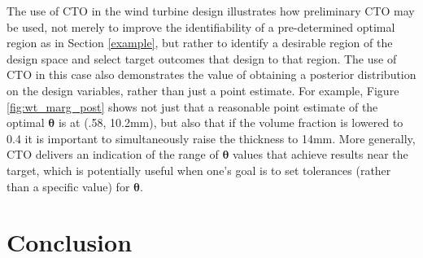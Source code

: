 \documentclass[12pt]{article}
\begin{document}
The use of CTO in the wind turbine design illustrates how preliminary CTO may be used, not merely to improve the identifiability of a pre-determined optimal region as in Section \ref{example}, but rather to identify a desirable region of the design space and select target outcomes that design to that region.
%
%
%
%
%
The use of CTO in this case also demonstrates the value of obtaining a posterior distribution on the design variables, rather than just a point estimate.
%
For example, Figure \ref{fig:wt_marg_post} shows not just that a reasonable point estimate of the optimal $\boldsymbol\theta$ is at (.58, 10.2mm), but also that if the volume fraction is lowered to 0.4 it is important to simultaneously raise the thickness to 14mm.
%
More generally, CTO delivers an indication of the range of $\boldsymbol\theta$ values that achieve results near the target, which is potentially useful when one's goal is to set tolerances (rather than a specific value) for $\boldsymbol\theta$.
%
%



\section{Conclusion} \label{conclusion}
\end{document}
